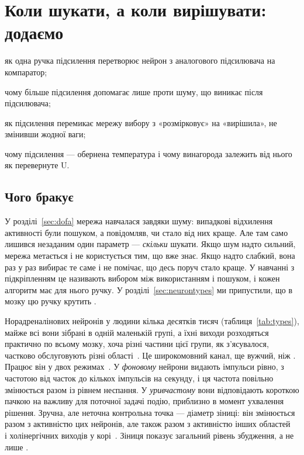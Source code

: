 \chapter{Коли шукати, а коли вирішувати: додаємо }
\label{sec:nora}
\begin{chaptergoals}
\item як одна ручка підсилення перетворює нейрон з аналогового підсилювача на компаратор;
\item чому більше підсилення допомагає лише проти шуму, що виникає після підсилювача;
\item як підсилення перемикає мережу вибору з «розмірковує» на «вирішила», не змінивши жодної ваги;
\item чому підсилення --- обернена температура і чому винагорода залежить від нього як перевернуте U.
\end{chaptergoals}

\section{Чого бракує}

У розділі~\ref{sec:dofa} мережа навчалася завдяки шуму: випадкові відхилення активності були пошуком, а  повідомляв, чи стало від них краще. Але там само лишився незаданим один параметр --- \emph{скільки} шукати. Якщо шум надто сильний, мережа метається і не користується тим, що вже знає. Якщо надто слабкий, вона раз у раз вибирає те саме і не помічає, що десь поруч стало краще. У навчанні з підкріпленням це називають вибором між використанням і пошуком, і кожен алгоритм має для нього ручку. У розділі~\ref{sec:neurontypes} ми припустили, що в мозку цю ручку крутить .

Норадреналінових нейронів у людини кілька десятків тисяч (таблиця~\ref{tab:types}), майже всі вони зібрані в одній маленькій групі, а їхні виходи розходяться практично по всьому мозку, хоча різні частини цієї групи, як з'ясувалося, частково обслуговують різні області~\cite{Poe2020}. Це широкомовний канал, ще вужчий, ніж . Працює він у двох режимах~\cite{AstonJones2005}. У \emph{фоновому} нейрони видають імпульси рівно, з частотою від часток до кількох імпульсів на секунду, і ця частота повільно змінюється разом із рівнем неспання. У \emph{уривчастому} вони відповідають короткою пачкою на важливу для поточної задачі подію, приблизно в момент ухвалення рішення. Зручна, але неточна контрольна точка --- діаметр зіниці: він змінюється разом з активністю цих нейронів, але також разом з активністю інших областей~\cite{Joshi2016} і холінергічних виходів у корі~\cite{Reimer2016}. Зіниця показує загальний рівень збудження, а не лише .

